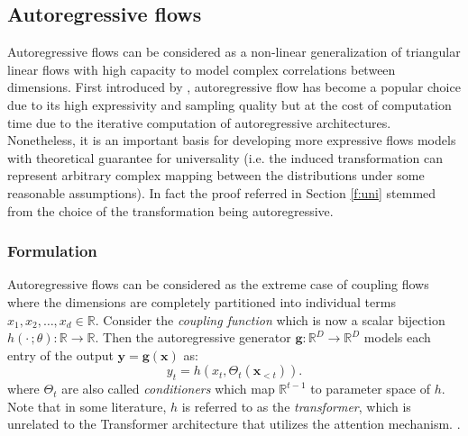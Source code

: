\subsection{Autoregressive flows}

Autoregressive flows can be considered as a non-linear generalization of
triangular linear flows with high capacity to model complex correlations between dimensions. First introduced by
\citep{kingmaImprovedVariationalInference2016}, autoregressive flow has become a popular choice
due to its high expressivity and sampling quality but at the cost of computation
time due to the iterative computation of autoregressive architectures. Nonetheless,
it is an important basis for developing more expressive
flows models with theoretical guarantee for universality (i.e. the induced
transformation can represent arbitrary complex mapping between
the distributions under some reasonable assumptions). In fact the
proof referred in Section \ref{f:uni} stemmed from the choice of the
transformation being autoregressive.

\subsubsection{Formulation}
Autoregressive flows can be considered as the extreme case of coupling flows
where the dimensions are completely partitioned into individual terms $x_1,
x_2,\ldots, x_d \in \mathbb{R}$. Consider the \textit{coupling function} which is now a scalar
bijection $h(
\cdot\,; \theta
): \mathbb{R} \to \mathbb{R}$. Then the autoregressive generator
$\mathbf{g}: \mathbb{R}^D \to \mathbb{R}^D$ models each entry of
the output $\mathbf{y} = \mathbf{g}(\mathbf{x})$ as:
$$
y_t = h(x_t, \Theta_t(\mathbf{x}_{<t}))
.$$
where $\Theta_t$ are also called \textit{conditioners} which map
$\mathbb{R}^{t-1}$ to parameter space of $h$. Note that in some literature, $h$ is
referred to as the \textit{transformer}, which is unrelated to the
Transformer architecture that utilizes the attention mechanism.
\citep{vaswaniAttentionAllYou2017}.

